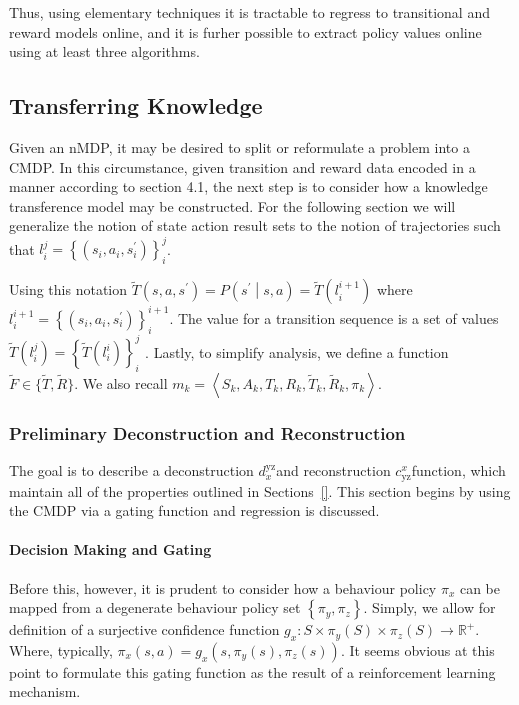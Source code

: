 \documentclass[compsoc,journal,letterpaper,10pt,draftcls,twocolumn]{IEEEtran}
\begin{document}
Thus, using elementary techniques it is tractable to regress to
transitional and reward models online, and it is furher possible to
extract policy values online using at least three algorithms.

\subsection{Transferring Knowledge}\label{transferring-knowledge}

Given an nMDP, it may be desired to split or reformulate a problem into
a CMDP. In this circumstance, given transition and reward data encoded
in a manner according to section 4.1, the next step is to consider how a
knowledge transference model may be constructed. For the following
section we will generalize the notion of state action result sets to the
notion of trajectories such that
$l_{i}^{j} = \left\{ (s_{i},a_{i},s_{i}^{\prime}) \right\}_{i}^{j}$.

Using this notation
$\tilde{T}\left( s,a,s^\prime \right) = P\left( s^{\prime}\middle | s, a \right) = \tilde{T}\left( l_{i}^{i + 1} \right)$ where
$l_{i}^{i + 1} = \left\{ (s_{i},a_{i},s_{i}^{\prime}) \right\}_{i}^{i + 1}$.
The value for a transition sequence is a set of values
\(\tilde{T}\left( l_{i}^{j} \right) = \left\{ \tilde{T}\left( l_{i}^{i} \right) \right\}_{i}^{j}\)
. Lastly, to simplify analysis, we define a function
$\tilde{F}\in\{\tilde{T},\tilde{R}\}$. We also recall
$m_{k} = \left\langle S_{k},A_{k},T_{k},R_{k},{\tilde{T}}_{k},{\tilde{R}}_{k},\pi_{k} \right\rangle$.

\subsubsection{Preliminary Deconstruction and Reconstruction
}\label{preliminary-deconstruction-and-reconstruction}

The goal is to describe a deconstruction \(d_{x}^{\text{yz}}\)and
reconstruction \(c_{\text{yz}}^{x}\)function, which maintain all of the
properties outlined in Sections~\ref{}. This section begins by using the
CMDP via a gating function and regression is discussed.

\paragraph{Decision Making and
Gating}\label{decision-making-and-gating}

Before this, however, it is prudent to consider how a behaviour policy
\(\pi_{x}\) can be mapped from a degenerate behaviour policy set
\(\left\{ \pi_{y},\pi_{z} \right\}\). Simply, we allow for definition of
a surjective confidence function
\(g_{x}:S \times \pi_{y}(S) \times \pi_{z}(S) \rightarrow \mathbb{R}^{+}\).
Where, typically,
\(\pi_{x}\left( s,a \right) = {g_{x}\left( s,\pi_{y}\left( s \right),\pi_{z}(s) \right)}\).
It seems obvious at this point to formulate this gating function as the
result of a reinforcement learning mechanism.
\end{document}
